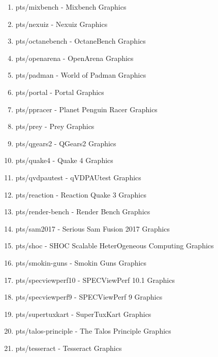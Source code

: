\documentclass[french]{article}
\begin{document}
\begin{enumerate}
\item pts/mixbench                   - Mixbench                            Graphics 
\item pts/nexuiz                     - Nexuiz                              Graphics 
\item pts/octanebench                - OctaneBench                         Graphics 
\item pts/openarena                  - OpenArena                           Graphics 
\item pts/padman                     - World of Padman                     Graphics 
\item pts/portal                     - Portal                              Graphics 
\item pts/ppracer                    - Planet Penguin Racer                Graphics 
\item pts/prey                       - Prey                                Graphics 
\item pts/qgears2                    - QGears2                             Graphics 
\item pts/quake4                     - Quake 4                             Graphics 
\item pts/qvdpautest                 - qVDPAUtest                          Graphics 
\item pts/reaction                   - Reaction Quake 3                    Graphics 
\item pts/render-bench               - Render Bench                        Graphics 
\item pts/sam2017                    - Serious Sam Fusion 2017             Graphics 
\item pts/shoc                       - SHOC Scalable HeterOgeneous Computing Graphics 
\item pts/smokin-guns                - Smokin Guns                         Graphics 
\item pts/specviewperf10             - SPECViewPerf 10.1                   Graphics 
\item pts/specviewperf9              - SPECViewPerf 9                      Graphics 
\item pts/supertuxkart               - SuperTuxKart                        Graphics 
\item pts/talos-principle            - The Talos Principle                 Graphics 
\item pts/tesseract                  - Tesseract                           Graphics 

\end{enumerate}
\end{document}
